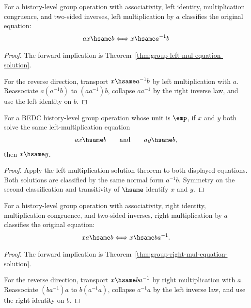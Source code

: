 \begin{theorem}
\label{thm:group-left-mul-equation-exactness}
For a history-level group operation with associativity, left identity,
multiplication congruence, and two-sided inverses, left multiplication by $a$
classifies the original equation:
$$
ax\hsame b \Longleftrightarrow x\hsame a^{-1}b
$$
\end{theorem}
\begin{proof}
The forward implication is Theorem~\ref{thm:group-left-mul-equation-solution}.

For the reverse direction, transport $x\hsame a^{-1}b$ by left multiplication
with $a$. Reassociate $a(a^{-1}b)$ to $(aa^{-1})b$, collapse $aa^{-1}$ by the
right inverse law, and use the left identity on $b$.
\end{proof}

\begin{theorem}
\label{thm:group-left-mul-equation-solution-unique}
For a BEDC history-level group operation whose unit is $\emp$, if $x$ and $y$
both solve the same left-multiplication equation
$$
ax\hsame b
\qquad\text{and}\qquad
ay\hsame b,
$$
then $x\hsame y$.
\end{theorem}
\begin{proof}
Apply the left-multiplication solution theorem to both displayed equations.
Both solutions are classified by the same normal form $a^{-1}b$. Symmetry on
the second classification and transitivity of $\hsame$ identify $x$ and $y$.
\end{proof}

\begin{theorem}
\label{thm:group-right-mul-equation-exactness}
For a history-level group operation with associativity, right identity,
multiplication congruence, and two-sided inverses, right multiplication by $a$
classifies the original equation:
$$
xa\hsame b \Longleftrightarrow x\hsame ba^{-1}.
$$
\end{theorem}
\begin{proof}
The forward implication is Theorem~\ref{thm:group-right-mul-equation-solution}.

For the reverse direction, transport $x\hsame ba^{-1}$ by right multiplication
with $a$. Reassociate $(ba^{-1})a$ to $b(a^{-1}a)$, collapse $a^{-1}a$ by the
left inverse law, and use the right identity on $b$.
\end{proof}

